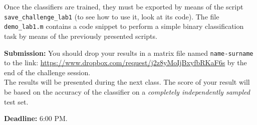 \documentclass[DIN, pagenumber=false, fontsize=11pt, parskip=half]{scrartcl}
\begin{document}
Once the classifiers are trained, they must be exported by means of the script \texttt{save\_challenge\_lab1}   (to see how to use it, look at its code). The file \texttt{demo\_lab1.m} contains a code snippet to perform a simple binary classification task by means of the previously presented scripts.



\begin{framed}
\textbf{Submission:}
You should drop your results in a matrix file named \texttt{name-surname} to the link: \url{https://www.dropbox.com/request/j2z8yMoIjBxyfbRKaF6s} by the end of the challenge session.\\
The results will be presented during the next class. The score of your result will be based on the accuracy of the classifier on a \textit{completely independently sampled} test set.

\textbf{Deadline:} 6:00 PM.
\end{framed}
\end{document}
